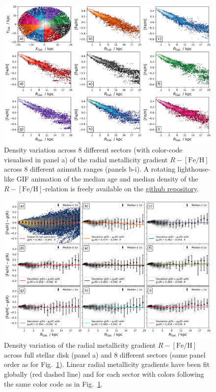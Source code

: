 \documentclass[fleqn,usenatbib]{mnras}
\begin{document}
\begin{figure}
    \centering
    \includegraphics[width=\textwidth]{figures/radial_metallicity_gradients_mw_in_angles.png}
    \caption{Density variation across 8 different sectors (with color-code visualised in panel a) of the radial metallicity gradient $R-\mathrm{[Fe/H]}$ across 8 different azimuth ranges (panels b-i). A rotating lighthouse-like GIF animation of the median age and median density of the $R-\mathrm{[Fe/H]}$-relation is freely available on the \href{https://github.com/svenbuder/nihao_radial_metallicity_gradients/blob/main/figures/xyz_rfeh.gif}{github repository}.}
    \label{fig:radial_metallicity_gradients_mw_in_angles}
\end{figure}

\begin{figure}
    \centering
    \includegraphics[width=\textwidth]{figures/linear_radial_metallicity_gradients_mw_in_angles.png}
    \caption{Density variation of the radial metallicity gradient $R-\mathrm{[Fe/H]}$ across full stellar disk (panel a) and 8 different sectors (same panel order as for Fig.~\ref{fig:radial_metallicity_gradients_mw_in_angles}). Linear radial metallicity gradients have been fit globally (red dashed line) and for each sector with colors following the same color code as in Fig.~\ref{fig:radial_metallicity_gradients_mw_in_angles}.}    \label{fig:linear_radial_metallicity_gradients_mw_in_angles}
\end{figure}
\end{document}
